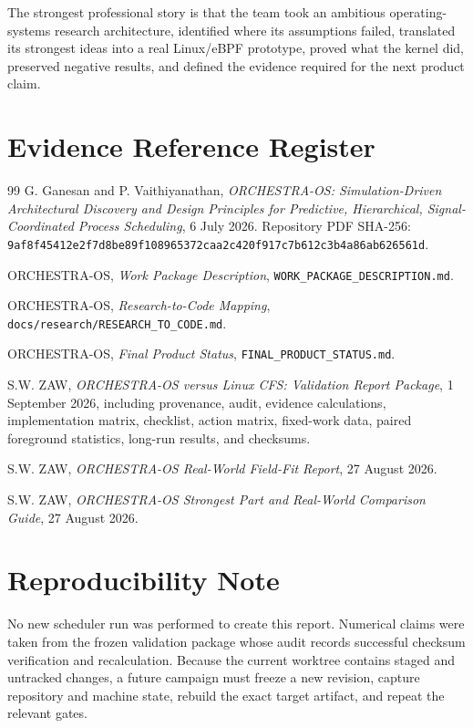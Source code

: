 \documentclass[11pt,a4paper,oneside]{report}
\begin{document}
The strongest professional story is that the team took an ambitious
operating-systems research architecture, identified where its assumptions
failed, translated its strongest ideas into a real Linux/eBPF prototype, proved
what the kernel did, preserved negative results, and defined the evidence
required for the next product claim.

\appendix
\chapter{Evidence Reference Register}

\small
\begin{thebibliography}{99}
G. Ganesan and P. Vaithiyanathan,
\emph{ORCHESTRA-OS: Simulation-Driven Architectural Discovery and Design
Principles for Predictive, Hierarchical, Signal-Coordinated Process Scheduling},
6 July 2026. Repository PDF SHA-256:
\texttt{9af8f45412e2f7d8be89f108965372caa2c420f917c7b612c3b4a86ab626561d}.

ORCHESTRA-OS, \emph{Work Package Description},
\texttt{WORK\_PACKAGE\_DESCRIPTION.md}.

ORCHESTRA-OS, \emph{Research-to-Code Mapping},
\texttt{docs/research/RESEARCH\_TO\_CODE.md}.

ORCHESTRA-OS, \emph{Final Product Status},
\texttt{FINAL\_PRODUCT\_STATUS.md}.

S.W. ZAW, \emph{ORCHESTRA-OS versus Linux CFS: Validation Report Package},
1 September 2026, including provenance, audit, evidence calculations,
implementation matrix, checklist, action matrix, fixed-work data, paired
foreground statistics, long-run results, and checksums.

S.W. ZAW, \emph{ORCHESTRA-OS Real-World Field-Fit Report}, 27 August 2026.

S.W. ZAW, \emph{ORCHESTRA-OS Strongest Part and Real-World Comparison Guide},
27 August 2026.
\end{thebibliography}

\chapter{Reproducibility Note}

No new scheduler run was performed to create this report. Numerical claims were
taken from the frozen validation package whose audit records successful
checksum verification and recalculation. Because the current worktree contains
staged and untracked changes, a future campaign must freeze a new revision,
capture repository and machine state, rebuild the exact target artifact, and
repeat the relevant gates.
\end{document}
